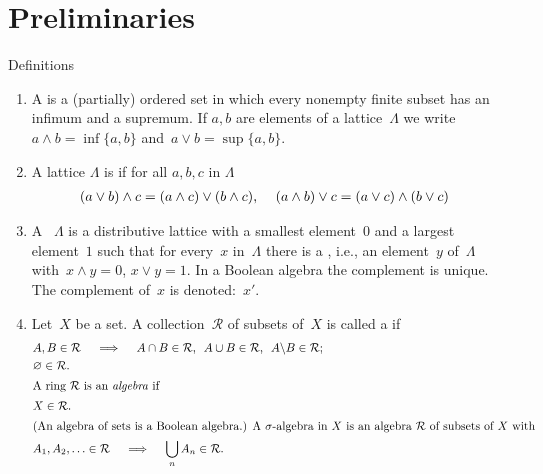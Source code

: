 \documentclass[main.tex]{subfiles}
\begin{document}
\section{Preliminaries}
%
%
\begin{psec}{1.1}{Definitions}
\begin{enumerate}
\item
\label{1.1-1} 
A  is a (partially) ordered set in which
every nonempty finite subset has an infimum and a supremum. 
If $a,b$ are elements of a lattice~$\Lambda$ 
we write~$a\wedge b = \inf\{a,b\}$
and~$a\vee b = \sup\{a,b\}$.
\item 
\label{1.1-2}
A lattice $\Lambda$ is 
if for all $a,b,c$ in $\Lambda$
\begin{align*}
(a\vee b)\wedge c &= (a\wedge c)\vee (b\wedge c)\text{, } &
(a\wedge b)\vee c &= (a\vee c) \wedge (b\vee c) 
\end{align*}
\item 
\label{1.1-3}
A ~$\Lambda$ is a distributive lattice
with a smallest element~$0$
and a largest element~$1$
such that for every~$x$ in~$\Lambda$
there is a ,
i.e., 
an element~$y$ of~$\Lambda$
with~$x\wedge y=0$, $x\vee y=1$.
In a Boolean algebra the complement is unique.
The complement of~$x$ is denoted:~$x'$.
\item 
\label{1.1-4}
Let~$X$ be a set.
A collection~$\mathcal{R}$ 
of subsets of~$X$
is called a  if
\begin{align*}
&A,B\in\mathcal{R} \quad \implies \quad 
  A\cap B \in \mathcal{R}\htam{, }\ 
  A\cup B \in \mathcal{R}\htam{, }\ 
  A\backslash B \in \mathcal{R}\htam{; } \\
&\varnothing \in \mathcal{R} 
\htam{.} \\
\intertext{%
A ring~$\mathcal{R}$ is an \keyword{algebra} if%
}
&X \in \mathcal{R}
\htam{.} \\
\intertext{%
(An algebra of sets is a Boolean algebra.) 
A $\sigma$-algebra in~$X$
is an algebra~$\mathcal{R}$
of subsets of~$X$
with%
}
& A_1, A_2, \ldots \in \mathcal{R}\quad \implies\quad 
  \bigcup_n A_n \in \mathcal{R}
\htam{.}
\end{align*}
\end{enumerate}
\end{psec}
%
%
\end{document}

